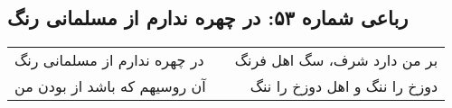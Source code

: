 \begin{center}
\section*{رباعی شماره ۵۳: در چهره ندارم از مسلمانی رنگ}
\label{sec:053}
\begin{longtable}{l p{0.5cm} r}
در چهره ندارم از مسلمانی رنگ
&&
بر من دارد شرف، سگ اهل فرنگ
\\
آن روسیهم که باشد از بودن من
&&
دوزخ را ننگ و اهل دوزخ را ننگ
\\
\end{longtable}
\end{center}
